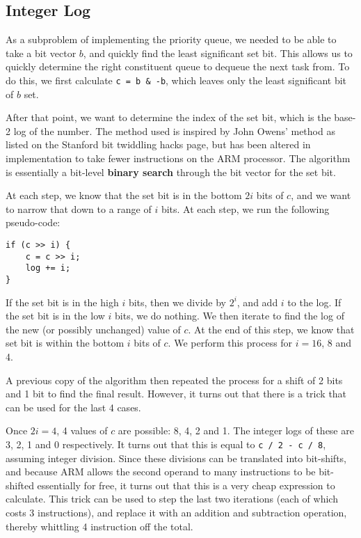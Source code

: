 \documentclass[titlepage]{article}
\begin{document}
\subsection{Integer Log}
As a subproblem of implementing the priority queue, we needed to be able to take
a bit vector $b$, and quickly find the least significant set bit.
This allows us to quickly determine the right constituent queue to dequeue the next
task from.
To do this, we first calculate \texttt{c = b \& -b}, which leaves only the least significant
bit of $b$ set.

After that point, we want to determine the index of the set bit, which is the
base-2 log of the number.
The method used is inspired by John Owens' method as listed on the Stanford bit
twiddling hacks page, but has been altered in implementation to take fewer
instructions on the ARM processor.
The algorithm is essentially a bit-level \textbf{binary search} through the bit
vector for the set bit.

At each step, we know that the set bit is in the bottom $2i$ bits of $c$, and we want
to narrow that down to a range of $i$ bits.
At each step, we run the following pseudo-code:

\begin{center}
\begin{lstlisting}
if (c >> i) {
    c = c >> i;
    log += i;
}
\end{lstlisting}
\end{center}

If the set bit is in the high $i$ bits, then we divide by $2^i$, and add $i$ to the log.
If the set bit is in the low $i$ bits, we do nothing.
We then iterate to find the log of the new (or possibly unchanged) value of $c$.
At the end of this step, we know that set bit is within the bottom $i$ bits of $c$.
We perform this process for $i=16$, 8 and 4.

A previous copy of the algorithm then repeated the process for a shift of 2 bits and 1 bit
to find the final result.
However, it turns out that there is a trick that can be used for the last 4 cases.

Once $2i=4$, 4 values of $c$ are possible: 8, 4, 2 and 1.
The integer logs of these are 3, 2, 1 and 0 respectively.
It turns out that this is equal to \texttt{c / 2 - c / 8},
assuming integer division.
Since these divisions can be translated into bit-shifts, and because
ARM allows the second operand to many instructions to be bit-shifted essentially
for free, it turns out that this is a very cheap expression to calculate.
This trick can be used to step the last two iterations (each of which costs 3
instructions), and replace it with an addition and subtraction operation,
thereby whittling 4 instruction off the total.
\end{document}
